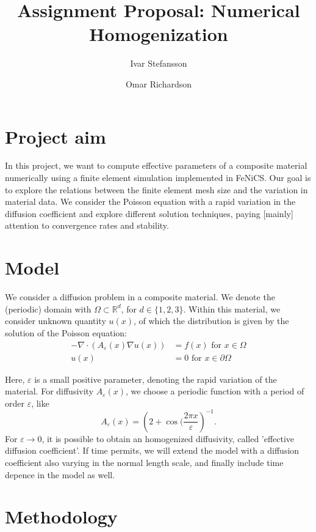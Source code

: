 \documentclass{article}
\title{Assignment Proposal: Numerical Homogenization}
\author[1]{Ivar Stefansson}
\author[2]{Omar Richardson}
\affil[1]{Department of Mathematics and Computer Science, Karlstad University}
\affil[2]{Department of Mathematics, University of Bergen}
\renewcommand{\epsilon}{\varepsilon}
\newcommand{\R}{\mathbb{ R}}
\begin{document}
\maketitle

\section{Project aim}
\label{sec:project_aim}

In this project, we want to compute effective parameters of a composite material numerically using a finite element simulation implemented in FeNiCS.
Our goal is to explore the relations between the finite element mesh size and the variation in material data.
We consider the Poisson equation with a rapid variation in the diffusion coefficient and explore different solution techniques, paying [mainly] attention to convergence rates and stability.

\section{Model}
\label{sec:model}
We consider a diffusion problem in a composite material. We denote the (periodic) domain with $\Omega \subset \R^d$, for $d\in\{1,2,3\}$. Within this material, we consider unknown quantity $u(x)$, of which the distribution is given by the solution of the Poisson equation:
\begin{equation}
    \begin{split}
        -\nabla \cdot (A_\epsilon(x)\nabla u(x)) &= f(x) \mbox{ for } x \in \Omega\\
        u(x) &= 0 \mbox{ for } x \in \partial\Omega
    \end{split}
    \label{eq:model}
\end{equation}

Here, $\epsilon$ is a small positive parameter, denoting the rapid variation of the material. 
For diffusivity $A_\epsilon(x)$, we choose a periodic function with a period of order $\epsilon$, like 
$$ A_\epsilon(x) = \left( 2+\cos(\frac{2\pi x}{\epsilon} \right)^{-1}.$$
For $\epsilon \to 0$, it is possible to obtain an homogenized diffusivity, called 'effective diffusion coefficient'.
If time permits, we will extend the model with a diffusion coefficient also varying in the normal length scale, and finally include time depence in the model as well.

\section{Methodology}
\label{sec:methodology}
\end{document}
